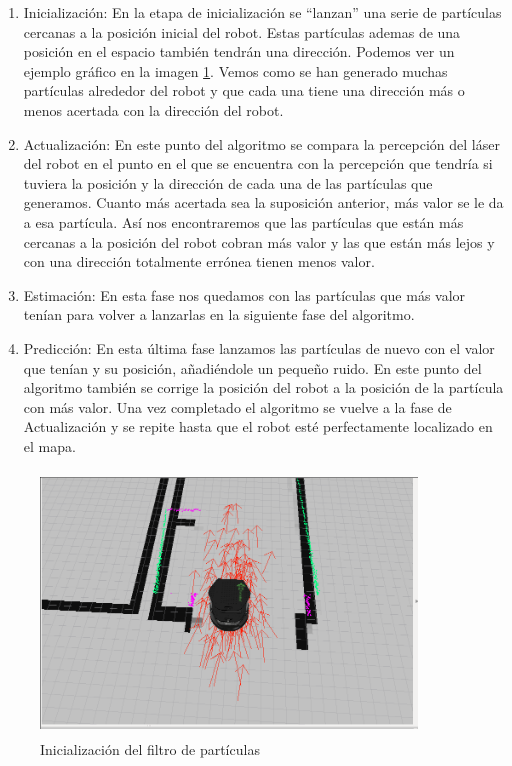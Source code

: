 \begin{enumerate}
\item Inicialización: En la etapa de inicialización se ``lanzan'' una serie de partículas cercanas a la posición inicial del robot. Estas partículas ademas de una posición en el espacio también tendrán una dirección. Podemos ver un ejemplo gráfico en la imagen \ref{fig:initamcl}. Vemos como se han generado muchas partículas alrededor del robot y que cada una tiene una dirección más o menos acertada con la dirección del robot.
\item Actualización: En este punto del algoritmo se compara la percepción del láser del robot en el punto en el que se encuentra con la percepción que tendría si tuviera la posición y la dirección de cada una de las partículas que generamos. Cuanto más acertada sea la suposición anterior, más valor se le da a esa partícula. Así nos encontraremos que las partículas que están más cercanas a la posición del robot cobran más valor y las que están más lejos y con una dirección totalmente errónea tienen menos valor.
\item Estimación: En esta fase nos quedamos con las partículas que más valor tenían para volver a lanzarlas en la siguiente fase del algoritmo.
\item Predicción: En esta última fase lanzamos las partículas de nuevo con el valor que tenían y su posición, añadiéndole un pequeño ruido.
En este punto del algoritmo también se corrige la posición del robot a la posición de la partícula con más valor.
Una vez completado el algoritmo se vuelve a la fase de Actualización y se repite hasta que el robot esté perfectamente localizado en el 
mapa.
\end{enumerate}

\begin{figure}[hbtp]
  \begin{center}
    \includegraphics[width=10cm,height=7cm]{img/cap3/initamcl}
  \end{center}
  \caption{Inicialización del filtro de partículas}
  \label{fig:initamcl}
\end{figure}


